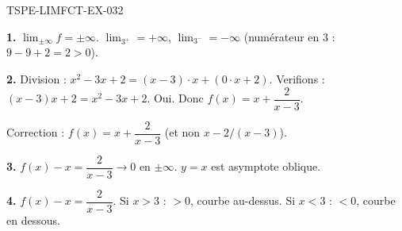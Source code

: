 \begin{corrige}{TSPE-LIMFCT-EX-032}

\textbf{1.} $\lim_{\pm\infty} f = \pm\infty$. $\lim_{3^+} = +\infty$, $\lim_{3^-} = -\infty$ (numérateur en $3$ : $9-9+2 = 2 > 0$).

\textbf{2.} Division : $x^2-3x+2 = (x-3) \cdot x + (0 \cdot x + 2)$. Verifions : $(x-3)x + 2 = x^2-3x+2$. Oui. Donc $f(x) = x + \dfrac{2}{x-3}$.

Correction : $f(x) = x + \dfrac{2}{x-3}$ (et non $x - 2/(x-3)$).

\textbf{3.} $f(x) - x = \dfrac{2}{x-3} \to 0$ en $\pm\infty$. $y = x$ est asymptote oblique.

\textbf{4.} $f(x) - x = \dfrac{2}{x-3}$. Si $x > 3$ : $> 0$, courbe au-dessus. Si $x < 3$ : $< 0$, courbe en dessous.

\end{corrige}
